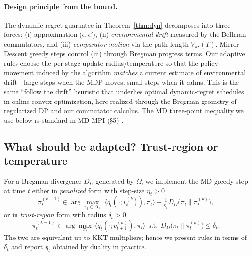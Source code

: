 \documentclass{article}
\theoremstyle{plain}
\theoremstyle{definition}
\theoremstyle{remark}
\newcommand{\1}{\mathbbm{1}}
\begin{document}
\paragraph{Design principle from the bound.}
The dynamic-regret guarantee in Theorem~\ref{thm:dyn} decomposes into three forces:
(i) approximation ($\epsilon,\epsilon'$), (ii) \emph{environmental drift} measured by the
Bellman commutators, and (iii) \emph{comparator motion} via the path-length
$V_{\pi^\star}(T)$. Mirror-Descent greedy steps control (iii) through Bregman
progress terms. Our adaptive rules choose the per-stage update radius/temperature so
that the policy movement induced by the algorithm \emph{matches} a current estimate of
environmental drift---large steps when the MDP moves, small steps when it calms.
This is the same ``follow the drift'' heuristic that underlies optimal dynamic-regret
schedules in online convex optimization, here realized through the Bregman geometry of
regularized DP and our commutator calculus.  The MD three-point inequality we use
below is standard in MD-MPI (\S5) \citep{geist2019theory}.  

\subsection{What should be adapted? Trust-region or temperature}
For a Bregman divergence $D_\Omega$ generated by $\Omega$, we implement the MD greedy step at time $t$
either in \emph{penalized} form with step-size $\eta_t>0$
\begin{equation}
\pi^{(k+1)}_t \in
\arg\max_{\pi_t\in\Delta_A}\ \big\langle q_t(\cdot;v^{(k)}_{t+1}),\pi_t\big\rangle
- \tfrac{1}{\eta_t}D_\Omega\!\big(\pi_t\|\pi^{(k)}_t\big),
\label{eq:penalized}
\end{equation}
or in \emph{trust-region} form with radius $\delta_t>0$
\begin{equation}
\pi^{(k+1)}_t \in
\arg\max_{\pi_t}\ \big\langle q_t(\cdot;v^{(k)}_{t+1}),\pi_t\big\rangle
\ \ \text{s.t.}\ \ D_\Omega\!\big(\pi_t\|\pi^{(k)}_t\big)\le\delta_t.
\label{eq:tr}
\end{equation}
The two are equivalent up to KKT multipliers; hence we present rules in terms of $\delta_t$
and report $\eta_t$ obtained by duality in practice.
\end{document}
